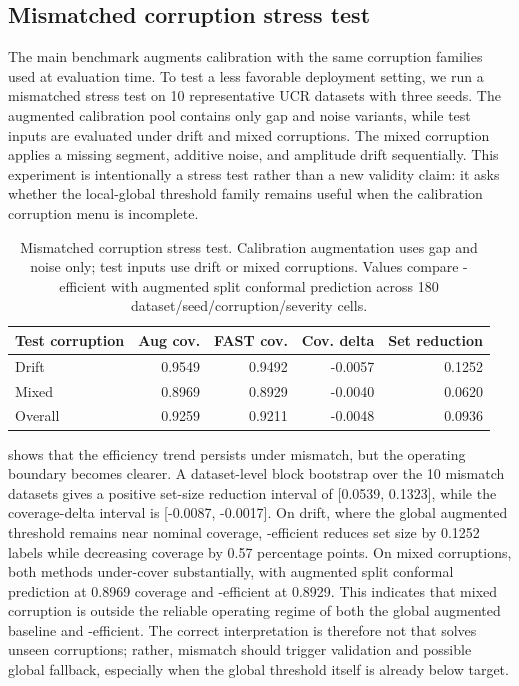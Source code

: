 \subsection{Mismatched corruption stress test}

The main benchmark augments calibration with the same corruption families used at evaluation time. To test a less favorable deployment setting, we run a mismatched stress test on 10 representative UCR datasets with three seeds. The augmented calibration pool contains only gap and noise variants, while test inputs are evaluated under drift and mixed corruptions. The mixed corruption applies a missing segment, additive noise, and amplitude drift sequentially. This experiment is intentionally a stress test rather than a new validity claim: it asks whether the local-global threshold family remains useful when the calibration corruption menu is incomplete.

\begin{table}[t]
\centering
\small
\caption{Mismatched corruption stress test. Calibration augmentation uses gap and noise only; test inputs use drift or mixed corruptions. Values compare \fastcp{}-efficient with augmented split conformal prediction across 180 dataset/seed/corruption/severity cells.}
\label{tab:mismatch_corruption}
\begin{tabular}{lrrrr}
\toprule
Test corruption & Aug cov. & FAST cov. & Cov. delta & Set reduction \\
\midrule
Drift & 0.9549 & 0.9492 & -0.0057 & 0.1252 \\
Mixed & 0.8969 & 0.8929 & -0.0040 & 0.0620 \\
Overall & 0.9259 & 0.9211 & -0.0048 & 0.0936 \\
\bottomrule
\end{tabular}
\end{table}

 shows that the efficiency trend persists under mismatch, but the operating boundary becomes clearer. A dataset-level block bootstrap over the 10 mismatch datasets gives a positive set-size reduction interval of [0.0539, 0.1323], while the coverage-delta interval is [-0.0087, -0.0017]. On drift, where the global augmented threshold remains near nominal coverage, \fastcp{}-efficient reduces set size by 0.1252 labels while decreasing coverage by 0.57 percentage points. On mixed corruptions, both methods under-cover substantially, with augmented split conformal prediction at 0.8969 coverage and \fastcp{}-efficient at 0.8929. This indicates that mixed corruption is outside the reliable operating regime of both the global augmented baseline and \fastcp{}-efficient. The correct interpretation is therefore not that \fastcp{} solves unseen corruptions; rather, mismatch should trigger validation and possible global fallback, especially when the global threshold itself is already below target.

